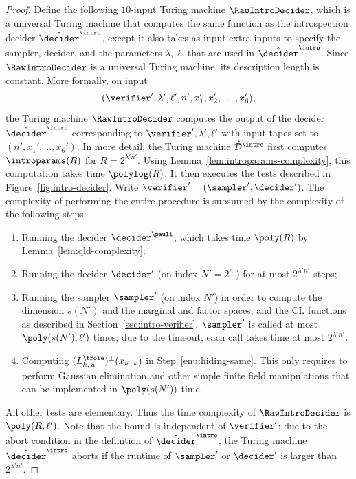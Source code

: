 \begin{proof}
  Define the following $10$-input Turing machine $\RawIntroDecider$,  which is 
  a universal Turing machine that computes the same function as the introspection decider $\tdint$, except
  it also takes as input extra inputs to specify the sampler, decider, and the parameters $\lambda, \ell$ that are 
  used in $\tdint$. Since $\RawIntroDecider$ is a universal Turing machine, its description length is constant.
  More formally, on input
  \begin{equation*}
    (\verifier', \lambda', \ell', n', x_1', x_2', \ldots, x_6'),
  \end{equation*}
     the Turing machine $\RawIntroDecider$ computes the output of the decider $\tdint$
    corresponding to $\verifier', \lambda', \ell'$ with input tapes set to $(n',x_1',\ldots,x_6')$.
In more detail, the Turing machine $\hat{\cal{D}}^{\intro}$ first computes
  $\introparams(R)$ for $R=2^{\lambda' n'}$. 
  Using Lemma~\ref{lem:introparams-complexity}, this computation takes time
   $\polylog(R)$.
  It then executes the tests described in Figure~\ref{fig:intro-decider}.
  Write $\verifier' = (\sampler', \decider')$.
  The complexity of performing the entire procedure is subsumed by the
  complexity of the following steps:
	\begin{enumerate}
  \item Running the decider $\decider^\pauli$, which takes time $\poly(R)$ by
    Lemma~\ref{lem:qld-complexity};
  \item Running the decider $\decider'$ (on index $N' = 2^{n'}$) for at most
    $2^{\lambda' n'}$ steps;
  \item Running the sampler $\sampler'$ (on index $N'$) in order to
    compute the dimension $s(N')$ and the marginal and factor spaces, and the CL
    functions as described in Section~\ref{sec:intro-verifier}.
    $\sampler'$ is called at most $\poly(s(N'),\ell')$ times; due to the timeout,
    each call takes time at most $2^{\lambda' n'}$.
  \item Computing $(L^\trole_{k,\, u})^\perp(x_{\overline{w},\, k})$ in
    Step~\ref{enu:hiding-same}.
    This only requires to perform Gaussian elimination and other simple finite
    field manipulations that can be implemented in $\poly(s(N'))$
    time.
	\end{enumerate}
  All other tests are elementary.
  Thus the time complexity of $\RawIntroDecider$ is $\poly(R,\ell')$.
  Note that the bound is independent of $\verifier'$: due to the abort
  condition in the definition of $\tdint$, the Turing machine
  $\hat{\decider}^\intro$ aborts if the runtime of $\sampler'$ or $\decider'$ is
  larger than $2^{\lambda' n'}$. 


\end{proof}
